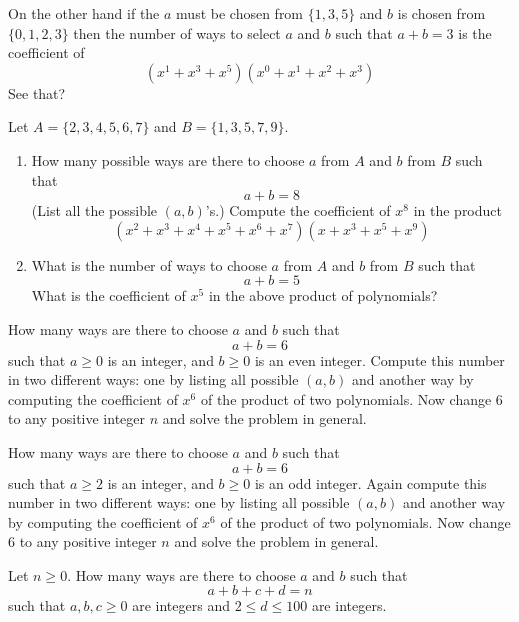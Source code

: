 On the other hand if the $a$ must be chosen from $\{1, 3, 5\}$ 
and $b$ is chosen from $\{0,1,2,3\}$ then the 
number of ways to select $a$ and $b$ such that $a + b = 3$
is the coefficient of 
\[
(x^1 + x^3 + x^5)(x^0 + x^1 + x^2 + x^3)
\]
See that?


\newpage
\begin{ex}
  Let $A = \{2, 3, 4, 5, 6, 7 \}$ and $B = \{ 1, 3, 5, 7, 9\}$.
  \begin{enumerate}[nosep,label=(\alph*)]
  \item
    How many possible ways are there to choose $a$ from $A$ and $b$ from $B$
    such that
    \[
    a + b = 8
    \]
    (List all the possible $(a,b)$'s.)
    Compute the coefficient of $x^8$ in the product
    \[
    (x^2+x^3+x^4+x^5+x^6+x^7)(x+x^3+x^5+x^9)
    \]
  \item
    What is the number of ways to choose $a$ from $A$ and $b$ from $B$
    such that 
    \[
    a + b = 5
    \]
    What is the coefficient of $x^5$ in the above product of polynomials?
  \end{enumerate}
\end{ex}



\newpage
\begin{ex}
How many ways are there to choose $a$ and $b$ such that
\[
a + b = 6
\]
such that $a \geq 0$ is an integer, and
$b \geq 0$ is an even integer.
Compute this number in two different ways:
one by listing all possible $(a, b)$ and another way by 
computing the coefficient of $x^6$ of the product
of two polynomials.
Now change 6 to any positive integer $n$ and solve the
problem in general.
\end{ex}


\newpage
\begin{ex}
How many ways are there to choose $a$ and $b$ such that
\[
a + b = 6
\]
such that $a \geq 2$ is an integer, and
$b \geq 0$ is an odd integer.
Again compute this number in two different ways:
one by listing all possible $(a, b)$ and another way by 
computing the coefficient of $x^6$ of the product
of two polynomials.
Now change 6 to any positive integer $n$ and solve the
problem in general.
\end{ex}


\newpage
\begin{ex}
Let $n \geq 0$.
How many ways are there to choose $a$ and $b$ such that
\[
a + b + c + d = n
\]
such that $a, b, c \geq 0$ are integers 
and $2 \leq d \leq 100$ are integers. 
\end{ex}



